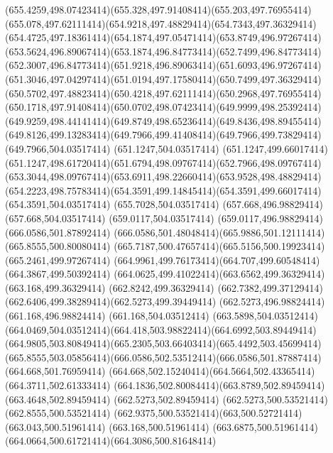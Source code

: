 {{	\curveto(655.4259,498.07423414)(655.328,497.91408414)(655.203,497.76955414)
	\curveto(655.078,497.62111414)(654.9218,497.48829414)(654.7343,497.36329414)
	\curveto(654.4725,497.18361414)(654.1874,497.05471414)(653.8749,496.97267414)
	\curveto(653.5624,496.89067414)(653.1874,496.84773414)(652.7499,496.84773414)
	\curveto(652.3007,496.84773414)(651.9218,496.89063414)(651.6093,496.97267414)
	\curveto(651.3046,497.04297414)(651.0194,497.17580414)(650.7499,497.36329414)
	\curveto(650.5702,497.48823414)(650.4218,497.62111414)(650.2968,497.76955414)
	\curveto(650.1718,497.91408414)(650.0702,498.07423414)(649.9999,498.25392414)
	\curveto(649.9259,498.44141414)(649.8749,498.65236414)(649.8436,498.89455414)
	\curveto(649.8126,499.13283414)(649.7966,499.41408414)(649.7966,499.73829414)
	\lineto(649.7966,504.03517414)
	\lineto(651.1247,504.03517414)
	\lineto(651.1247,499.66017414)
	\curveto(651.1247,498.61720414)(651.6794,498.09767414)(652.7966,498.09767414)
	\curveto(653.3044,498.09767414)(653.6911,498.22660414)(653.9528,498.48829414)
	\curveto(654.2223,498.75783414)(654.3591,499.14845414)(654.3591,499.66017414)
	\lineto(654.3591,504.03517414)
	\lineto(655.7028,504.03517414)
	\closepath
	\moveto(657.668,496.98829414)
	\lineto(657.668,504.03517414)
	\lineto(659.0117,504.03517414)
	\lineto(659.0117,496.98829414)
	\closepath
	\moveto(666.0586,501.87892414)
	\curveto(666.0586,501.48048414)(665.9886,501.12111414)(665.8555,500.80080414)
	\curveto(665.7187,500.47657414)(665.5156,500.19923414)(665.2461,499.97267414)
	\curveto(664.9961,499.76173414)(664.707,499.60548414)(664.3867,499.50392414)
	\curveto(664.0625,499.41022414)(663.6562,499.36329414)(663.168,499.36329414)
	\lineto(662.8242,499.36329414)
	\curveto(662.7382,499.37129414)(662.6406,499.38289414)(662.5273,499.39449414)
	\lineto(662.5273,496.98824414)
	\lineto(661.168,496.98824414)
	\lineto(661.168,504.03512414)
	\lineto(663.5898,504.03512414)
	\curveto(664.0469,504.03512414)(664.418,503.98822414)(664.6992,503.89449414)
	\curveto(664.9805,503.80849414)(665.2305,503.66403414)(665.4492,503.45699414)
	\curveto(665.8555,503.05856414)(666.0586,502.53512414)(666.0586,501.87887414)
	\closepath
	\moveto(664.668,501.76959414)
	\curveto(664.668,502.15240414)(664.5664,502.43365414)(664.3711,502.61333414)
	\curveto(664.1836,502.80084414)(663.8789,502.89459414)(663.4648,502.89459414)
	\lineto(662.5273,502.89459414)
	\lineto(662.5273,500.53521414)
	\lineto(662.8555,500.53521414)
	\curveto(662.9375,500.53521414)(663,500.52721414)(663.043,500.51961414)
	\lineto(663.168,500.51961414)
	\curveto(663.6875,500.51961414)(664.0664,500.61721414)(664.3086,500.81648414)
}}
